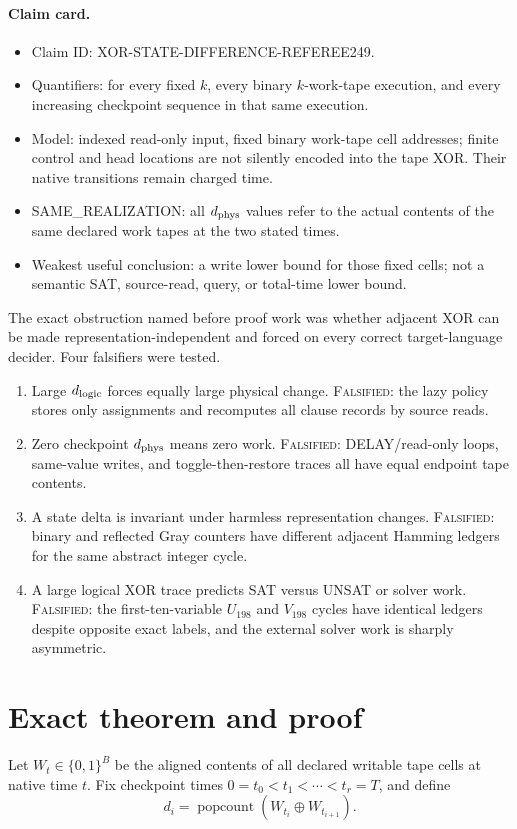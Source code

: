 \documentclass[11pt]{article}
\newcommand{\Status}[1]{\textsc{#1}}
\begin{document}
\paragraph{Claim card.}
\begin{itemize}
\item Claim ID: XOR-STATE-DIFFERENCE-REFEREE249.
\item Quantifiers: for every fixed $k$, every binary $k$-work-tape execution,
and every increasing checkpoint sequence in that same execution.
\item Model: indexed read-only input, fixed binary work-tape cell addresses;
finite control and head locations are not silently encoded into the tape XOR.
Their native transitions remain charged time.
\item SAME\_REALIZATION: all $d_{\rm phys}$ values refer to the actual contents
of the same declared work tapes at the two stated times.
\item Weakest useful conclusion: a write lower bound for those fixed cells;
not a semantic SAT, source-read, query, or total-time lower bound.
\end{itemize}

The exact obstruction named before proof work was whether adjacent XOR can be
made representation-independent and forced on every correct target-language
decider.  Four falsifiers were tested.
\begin{enumerate}
\item Large $d_{\rm logic}$ forces equally large physical change.
\Status{Falsified}: the lazy policy stores only assignments and recomputes all
clause records by source reads.
\item Zero checkpoint $d_{\rm phys}$ means zero work.
\Status{Falsified}: DELAY/read-only loops, same-value writes, and
toggle-then-restore traces all have equal endpoint tape contents.
\item A state delta is invariant under harmless representation changes.
\Status{Falsified}: binary and reflected Gray counters have different adjacent
Hamming ledgers for the same abstract integer cycle.
\item A large logical XOR trace predicts SAT versus UNSAT or solver work.
\Status{Falsified}: the first-ten-variable $U_{198}$ and $V_{198}$ cycles have
identical ledgers despite opposite exact labels, and the external solver work
is sharply asymmetric.
\end{enumerate}

\section{Exact theorem and proof}
Let $W_t\in\{0,1\}^{B}$ be the aligned contents of all declared writable tape
cells at native time $t$.  Fix checkpoint times
$0=t_0<t_1<\cdots<t_r=T$, and define
\[
 d_i=\operatorname{popcount}(W_{t_i}\oplus W_{t_{i+1}}).
\]
\end{document}
